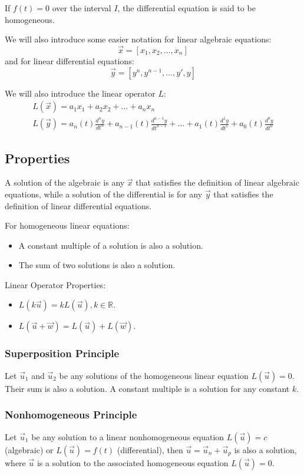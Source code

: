 If $f(t)=0$ over the interval $I$, the differential equation is said to be homogeneous.

We will also introduce some easier notation for linear algebraic equations:
\[
\vec{x} = [x_1, x_2, \dots, x_n]
\]
and for linear differential equations:
\[
\vec{y} = [y^n, y^{n-1}, \dots, y\prime, y]
\]

We will also introduce the linear operator $L$:
\[
\begin{aligned}
L(\vec{x}) = a_1x_1 + a_2x_2 + \dots + a_nx_n\\
L(\vec{y}) = a_n(t) \frac{d^ny}{dt^n} + a_{n-1}(t) \frac{d^{n-1}y}{dt^{n-1} } + \dots + a_1(t) \frac{d^1y}{dt^1} + a_0(t) \frac{d^0y}{dt^0}
\end{aligned}
\]

    \subsection{Properties}
    A solution of the algebraic is any $\vec{x}$ that satisfies the definition of linear algebraic equations, while a solution of the differential is for any $\vec{y}$ that satisfies the definition of linear differential equations.

    For homogeneous linear equations:
    \begin{itemize}
    \item A constant multiple of a solution is also a solution.
    \item The sum of two solutions is also a solution.
    \end{itemize}

    Linear Operator Properties:
    \begin{itemize}
    \item $L(k \vec{u}) = k L(\vec{u}), k \in \mathbb{R}$.
    \item $L(\vec{u} + \vec{w}) = L(\vec{u}) + L(\vec{w})$.
    \end{itemize}

    \subsubsection{Superposition Principle}
    Let $\vec{u}_1$ and $\vec{u}_2$ be any solutions of the homogeneous linear equation $L(\vec{u}) = 0$. Their sum is also a solution. A constant multiple is a solution for any constant $k$.

    \subsubsection{Nonhomogeneous Principle}
    Let $\vec{u}_1$ be any solution to a linear nonhomogeneous equation $L(\vec{u}) = c$ (algebraic) or $L(\vec{u}) = f(t)$ (differential), then $\vec{u} = \vec{u}_n + \vec{u}_p$ is also a solution, where $\vec{u}$ is a solution to the associated homogeneous equation $L(\vec{u}) = 0$.

